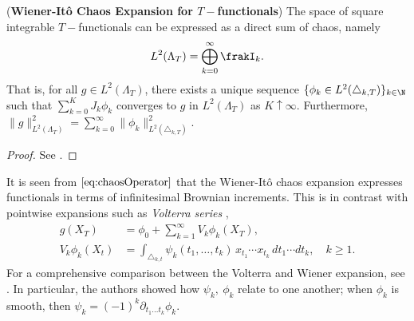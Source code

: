 \begin{theorem}\textnormal{(\textbf{Wiener-Itô Chaos Expansion for $T-$functionals})}
\label{thm:Wiener1} The space of square integrable $T-$functionals can be expressed as a direct sum of chaos, namely
$$L^2(\Lambda_T) = \bigoplus_{k=0}^\infty \frakI_k. $$
That is, for all $g \in L^2(\Lambda_T)$, there exists  a unique sequence $\{\phi_k \in L^2(\triangle_{k,T})\}_{k \in \N}$  such that  $\sum_{k=0}^{K} J_k \phi_k$
converges to $g$ in $L^2(\Lambda_T)$ as $K \uparrow \infty$. %
Furthermore, %
$\lVert g \rVert^2_{L^2(\Lambda_T)} = \sum_{k=0}^{\infty} \lVert\phi_k \rVert^2_{L^2(\triangle_{k,T})}$.

\end{theorem}

\begin{proof}
See \cite[Theorem 1.10]{DiNunno}.
\end{proof} 

It is seen from $\eqref{eq:chaosOperator}$ that the Wiener-It\^o chaos expansion  expresses functionals in terms of infinitesimal Brownian increments. This is in contrast with pointwise expansions such as \textit{Volterra series} \cite{Volterra},
 \begin{align*}
 g(X_T) &= \phi_0 + \sum_{k= 1}^{\infty} V_k \phi_k(X_T), \\ 
   V_k \phi_k(X_t) &= \int_{\triangle_{k,t}}  \psi_k(t_1,\ldots,t_k) \, x_{t_1} \cdots x_{t_k}\, dt_1 \cdots dt_k, \quad  k\ge 1.
 \end{align*}
For a comprehensive comparison between the Volterra and Wiener expansion, see  \citet{PalmPoggio}. 
In particular, the authors  showed how $\psi_k, \ \phi_k$ relate to one another; when $\phi_k$ is smooth, then 
$\psi_k = (-1)^k \partial_{t_1...t_k} \phi_k$. %



